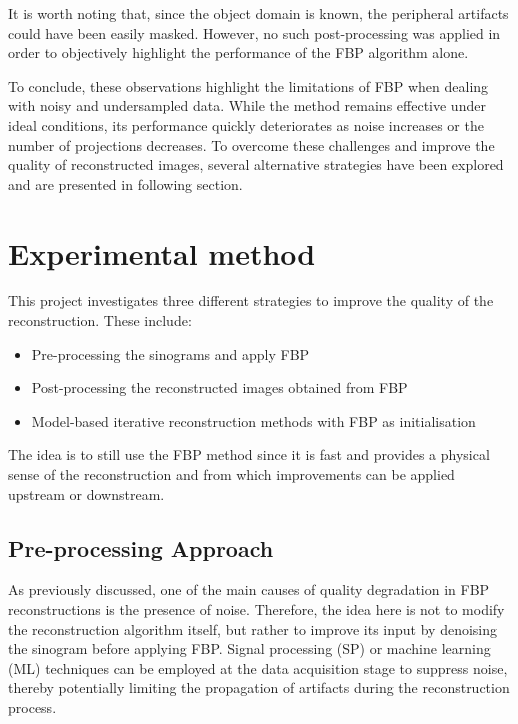 \documentclass{article}
\begin{document}
It is worth noting that, since the object domain is known, the peripheral artifacts could have been easily masked. However, no such post-processing was applied in order to objectively highlight the performance of the FBP algorithm alone.
\medskip

To conclude, these observations highlight the limitations of FBP when dealing with noisy and undersampled data. While the method remains effective under ideal conditions, its performance quickly deteriorates as noise increases or the number of projections decreases. To overcome these challenges and improve the quality of reconstructed images, several alternative strategies have been explored and are presented in following section. 



 
\section{Experimental method}
This project investigates three different strategies to improve the quality of the reconstruction. These include:
\begin{itemize}
    \item Pre-processing the sinograms and apply FBP
    \item Post-processing the reconstructed images obtained from FBP
    \item Model-based iterative reconstruction methods with FBP as initialisation
\end{itemize}
 The idea is to still use the FBP method since it is fast and provides a physical sense of the reconstruction and from which improvements can be applied upstream or downstream. 
\subsection*{Pre-processing Approach}
As previously discussed, one of the main causes of quality degradation in FBP reconstructions is the presence of noise. Therefore, the idea here is not to modify the reconstruction algorithm itself, but rather to improve its input by denoising the sinogram before applying FBP. Signal processing (SP) or machine learning (ML) techniques can be employed at the data acquisition stage to suppress noise, thereby potentially limiting the propagation of artifacts during the reconstruction process.
\end{document}
